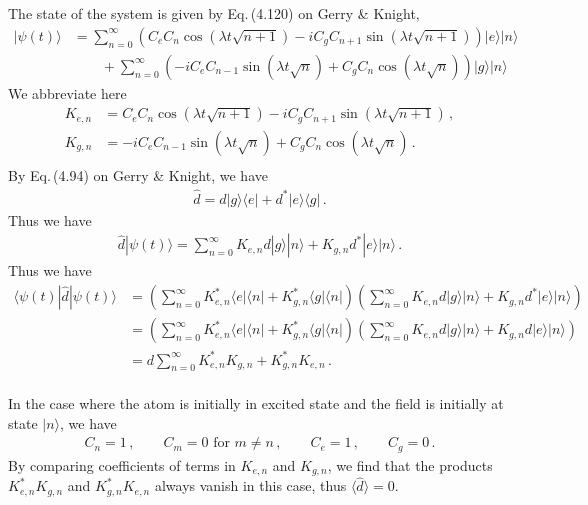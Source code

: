 \documentclass[11pt, oneside]{book}
\theoremstyle{break}
\theoremstyle{break}
\begin{document}
\chapter{}
The state of the system is given by Eq.\,(4.120) on Gerry \& Knight, 
\begin{align*}
|\psi(t) \rangle &= \sum_{n=0}^\infty 
\left(C_eC_n \cos(\lambda t \sqrt{n+1}) - i C_g C_{n+1}\sin(\lambda t \sqrt{n+1}) \right)|e\rangle |n\rangle
\\
&{}\qquad + \sum_{n=0}^\infty \left(-i C_e C_{n-1}\sin(\lambda t\sqrt{n}) + C_gC_n \cos(\lambda t \sqrt{n})\right) |g\rangle |n\rangle
\end{align*}
We abbreviate here 
\begin{align*}
K_{e,n} &= C_eC_n \cos(\lambda t \sqrt{n+1}) - i C_g C_{n+1}\sin(\lambda t \sqrt{n+1})\,,\\
K_{g,n} &= -i C_e C_{n-1}\sin(\lambda t\sqrt{n}) + C_gC_n \cos(\lambda t \sqrt{n})\,.\\
\end{align*}
By Eq.\,(4.94) on Gerry \& Knight, we have
\begin{align*}
\hat{d} = d |g\rangle \langle e| + d^* |e\rangle \langle g|\,.
\end{align*}
Thus we have
\begin{align*}
\hat{d}|\psi(t) \rangle = 
\sum_{n=0}^\infty K_{e,n}d |g\rangle | n\rangle + K_{g,n} d^* |e\rangle |n\rangle\,.
\end{align*}
Thus we have
\begin{align*}
\langle \psi(t) |\hat{d}|\psi(t) \rangle 
&= \left(\sum_{n=0}^\infty K_{e,n}^* \langle e| \langle n| + K_{g,n}^* \langle g| \langle n| \right)\left(\sum_{n=0}^\infty K_{e,n}d |g\rangle | n\rangle + K_{g,n} d^* |e\rangle |n\rangle\right)\\
&= \left(\sum_{n=0}^\infty K_{e,n}^* \langle e| \langle n| + K_{g,n}^*  \langle g| \langle n| \right)\left(\sum_{n=0}^\infty K_{e,n}d |g\rangle | n\rangle + K_{g,n} d |e\rangle |n\rangle\right)\\
&= d\sum_{n=0}^\infty K_{e,n}^*K_{g,n}  + K_{g,n}^*K_{e,n} \,. \tag{3.1}
\end{align*}
\setcounter{equation}{1}\\
In the case where the atom is initially in excited state and the field is initially at state $|n\rangle$, we have
\begin{align*}
C_n =1\,, \qquad C_{m} = 0\text{ for }m\neq n\,,\qquad C_e = 1\,,\qquad C_g = 0\,.
\end{align*}
By comparing coefficients of terms in $K_{e,n}$ and $K_{g,n}$, we find that the products $K_{e,n}^*K_{g,n}$ and $K_{g,n}^*K_{e,n}$ always vanish in this case, thus $\langle \hat{d}\rangle = 0$. \\
\end{document}
